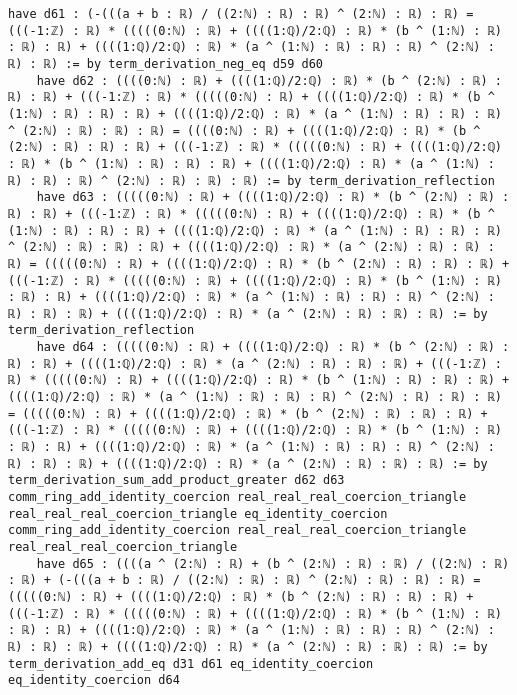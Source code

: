 \documentclass{article}
\begin{document}
\begin{tcolorbox}[colback=white!10, width=\linewidth]
\begin{lstlisting}[language=Lean4]
    have d61 : (-(((a + b : ℝ) / ((2:ℕ) : ℝ) : ℝ) ^ (2:ℕ) : ℝ) : ℝ) = (((-1:ℤ) : ℝ) * (((((0:ℕ) : ℝ) + ((((1:ℚ)/2:ℚ) : ℝ) * (b ^ (1:ℕ) : ℝ) : ℝ) : ℝ) + ((((1:ℚ)/2:ℚ) : ℝ) * (a ^ (1:ℕ) : ℝ) : ℝ) : ℝ) ^ (2:ℕ) : ℝ) : ℝ) := by term_derivation_neg_eq d59 d60
    have d62 : ((((0:ℕ) : ℝ) + ((((1:ℚ)/2:ℚ) : ℝ) * (b ^ (2:ℕ) : ℝ) : ℝ) : ℝ) + (((-1:ℤ) : ℝ) * (((((0:ℕ) : ℝ) + ((((1:ℚ)/2:ℚ) : ℝ) * (b ^ (1:ℕ) : ℝ) : ℝ) : ℝ) + ((((1:ℚ)/2:ℚ) : ℝ) * (a ^ (1:ℕ) : ℝ) : ℝ) : ℝ) ^ (2:ℕ) : ℝ) : ℝ) : ℝ) = ((((0:ℕ) : ℝ) + ((((1:ℚ)/2:ℚ) : ℝ) * (b ^ (2:ℕ) : ℝ) : ℝ) : ℝ) + (((-1:ℤ) : ℝ) * (((((0:ℕ) : ℝ) + ((((1:ℚ)/2:ℚ) : ℝ) * (b ^ (1:ℕ) : ℝ) : ℝ) : ℝ) + ((((1:ℚ)/2:ℚ) : ℝ) * (a ^ (1:ℕ) : ℝ) : ℝ) : ℝ) ^ (2:ℕ) : ℝ) : ℝ) : ℝ) := by term_derivation_reflection
    have d63 : (((((0:ℕ) : ℝ) + ((((1:ℚ)/2:ℚ) : ℝ) * (b ^ (2:ℕ) : ℝ) : ℝ) : ℝ) + (((-1:ℤ) : ℝ) * (((((0:ℕ) : ℝ) + ((((1:ℚ)/2:ℚ) : ℝ) * (b ^ (1:ℕ) : ℝ) : ℝ) : ℝ) + ((((1:ℚ)/2:ℚ) : ℝ) * (a ^ (1:ℕ) : ℝ) : ℝ) : ℝ) ^ (2:ℕ) : ℝ) : ℝ) : ℝ) + ((((1:ℚ)/2:ℚ) : ℝ) * (a ^ (2:ℕ) : ℝ) : ℝ) : ℝ) = (((((0:ℕ) : ℝ) + ((((1:ℚ)/2:ℚ) : ℝ) * (b ^ (2:ℕ) : ℝ) : ℝ) : ℝ) + (((-1:ℤ) : ℝ) * (((((0:ℕ) : ℝ) + ((((1:ℚ)/2:ℚ) : ℝ) * (b ^ (1:ℕ) : ℝ) : ℝ) : ℝ) + ((((1:ℚ)/2:ℚ) : ℝ) * (a ^ (1:ℕ) : ℝ) : ℝ) : ℝ) ^ (2:ℕ) : ℝ) : ℝ) : ℝ) + ((((1:ℚ)/2:ℚ) : ℝ) * (a ^ (2:ℕ) : ℝ) : ℝ) : ℝ) := by term_derivation_reflection
    have d64 : (((((0:ℕ) : ℝ) + ((((1:ℚ)/2:ℚ) : ℝ) * (b ^ (2:ℕ) : ℝ) : ℝ) : ℝ) + ((((1:ℚ)/2:ℚ) : ℝ) * (a ^ (2:ℕ) : ℝ) : ℝ) : ℝ) + (((-1:ℤ) : ℝ) * (((((0:ℕ) : ℝ) + ((((1:ℚ)/2:ℚ) : ℝ) * (b ^ (1:ℕ) : ℝ) : ℝ) : ℝ) + ((((1:ℚ)/2:ℚ) : ℝ) * (a ^ (1:ℕ) : ℝ) : ℝ) : ℝ) ^ (2:ℕ) : ℝ) : ℝ) : ℝ) = (((((0:ℕ) : ℝ) + ((((1:ℚ)/2:ℚ) : ℝ) * (b ^ (2:ℕ) : ℝ) : ℝ) : ℝ) + (((-1:ℤ) : ℝ) * (((((0:ℕ) : ℝ) + ((((1:ℚ)/2:ℚ) : ℝ) * (b ^ (1:ℕ) : ℝ) : ℝ) : ℝ) + ((((1:ℚ)/2:ℚ) : ℝ) * (a ^ (1:ℕ) : ℝ) : ℝ) : ℝ) ^ (2:ℕ) : ℝ) : ℝ) : ℝ) + ((((1:ℚ)/2:ℚ) : ℝ) * (a ^ (2:ℕ) : ℝ) : ℝ) : ℝ) := by term_derivation_sum_add_product_greater d62 d63 comm_ring_add_identity_coercion real_real_real_coercion_triangle real_real_real_coercion_triangle eq_identity_coercion comm_ring_add_identity_coercion real_real_real_coercion_triangle real_real_real_coercion_triangle
    have d65 : ((((a ^ (2:ℕ) : ℝ) + (b ^ (2:ℕ) : ℝ) : ℝ) / ((2:ℕ) : ℝ) : ℝ) + (-(((a + b : ℝ) / ((2:ℕ) : ℝ) : ℝ) ^ (2:ℕ) : ℝ) : ℝ) : ℝ) = (((((0:ℕ) : ℝ) + ((((1:ℚ)/2:ℚ) : ℝ) * (b ^ (2:ℕ) : ℝ) : ℝ) : ℝ) + (((-1:ℤ) : ℝ) * (((((0:ℕ) : ℝ) + ((((1:ℚ)/2:ℚ) : ℝ) * (b ^ (1:ℕ) : ℝ) : ℝ) : ℝ) + ((((1:ℚ)/2:ℚ) : ℝ) * (a ^ (1:ℕ) : ℝ) : ℝ) : ℝ) ^ (2:ℕ) : ℝ) : ℝ) : ℝ) + ((((1:ℚ)/2:ℚ) : ℝ) * (a ^ (2:ℕ) : ℝ) : ℝ) : ℝ) := by term_derivation_add_eq d31 d61 eq_identity_coercion eq_identity_coercion d64

\end{lstlisting}
\end{tcolorbox}
\end{document}
